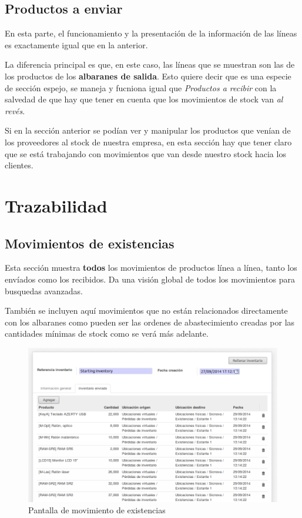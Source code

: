 \subsection{Productos a enviar}
En esta parte, el funcionamiento y la presentación de la información de las líneas es exactamente igual que en la anterior. 

La diferencia principal es que, en este caso, las líneas que se muestran son las de los productos de los \textbf{albaranes de salida}. Esto quiere decir que es una especie de sección espejo, se maneja y fucniona igual que \emph{Productos a recibir} con la salvedad de que hay que tener en cuenta que los movimientos de stock van \emph{al revés}.

Si en la sección anterior se podían ver y manipular los productos que venían de los proveedores al stock de nuestra empresa, en esta sección hay que tener claro que se está trabajando con movimientos que van desde nuestro stock hacia los clientes.






\section{Trazabilidad}

\subsection{Movimientos de existencias}
Esta sección muestra \textbf{todos} los movimientos de productos línea a línea, tanto los envíados como los recibidos. Da una visión global de todos
los movimientos para busquedas avanzadas.

También se incluyen aquí movimientos que no están relacionados directamente con los albaranes como pueden ser las ordenes de abastecimiento creadas
por las cantidades mínimas de stock como se verá más adelante.

\begin{figure}[H]
\includegraphics[width=\textwidth]{almacen/img/tra_mov.png}
\caption{Pantalla de movimiento de existencias}
\label{al:movex}
\end{figure}

